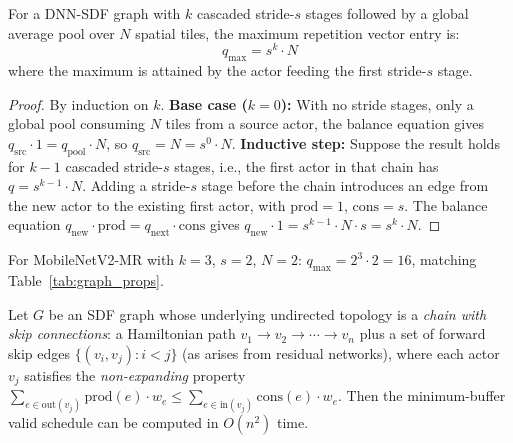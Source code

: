 \documentclass[journal]{IEEEtran}
\begin{document}
\begin{proposition}
\label{prop:qmax}
For a DNN-SDF graph with $k$ cascaded stride-$s$ stages followed by a global average pool over $N$ spatial tiles, the maximum repetition vector entry is:
\begin{equation}
q_{\max} = s^k \cdot N
\label{eq:qmax}
\end{equation}
where the maximum is attained by the actor feeding the first stride-$s$ stage.
\end{proposition}

\begin{proof}
By induction on $k$. \textbf{Base case ($k = 0$):} With no stride stages, only a global pool consuming $N$ tiles from a source actor, the balance equation gives $q_{\mathrm{src}} \cdot 1 = q_{\mathrm{pool}} \cdot N$, so $q_{\mathrm{src}} = N = s^0 \cdot N$.
\textbf{Inductive step:} Suppose the result holds for $k - 1$ cascaded stride-$s$ stages, i.e., the first actor in that chain has $q = s^{k-1} \cdot N$.
Adding a stride-$s$ stage before the chain introduces an edge from the new actor to the existing first actor, with $\mathrm{prod} = 1$, $\mathrm{cons} = s$.
The balance equation $q_{\mathrm{new}} \cdot \mathrm{prod} = q_{\mathrm{next}} \cdot \mathrm{cons}$ gives $q_{\mathrm{new}} \cdot 1 = s^{k-1} \cdot N \cdot s = s^k \cdot N$.
\end{proof}

For MobileNetV2-MR with $k = 3$, $s = 2$, $N = 2$: $q_{\max} = 2^3 \cdot 2 = 16$, matching Table~\ref{tab:graph_props}.

\begin{theorem}
\label{thm:poly_buffer}
Let $G$ be an SDF graph whose underlying undirected topology is a \emph{chain with skip connections}: a Hamiltonian path $v_1 \to v_2 \to \cdots \to v_n$ plus a set of forward skip edges $\{(v_i, v_j) : i < j\}$ (as arises from residual networks), where each actor $v_j$ satisfies the \emph{non-expanding} property $\sum_{e \in \mathrm{out}(v_j)} \mathrm{prod}(e) \cdot w_e \leq \sum_{e \in \mathrm{in}(v_j)} \mathrm{cons}(e) \cdot w_e$.
Then the minimum-buffer valid schedule can be computed in $O(n^2)$ time.
\end{theorem}
\end{document}
